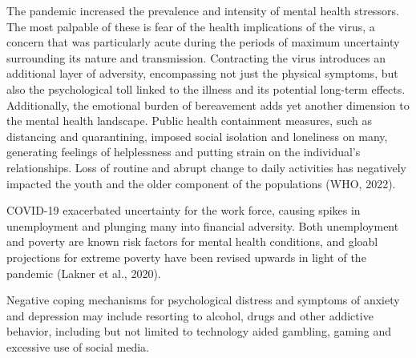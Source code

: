     The pandemic increased the prevalence and intensity of mental health stressors. The most palpable of these is fear of the health implications of the virus, a concern that was particularly acute during the periods of maximum uncertainty surrounding its nature and transmission. Contracting the virus introduces an additional layer of adversity, encompassing not just the physical symptoms, but also the psychological toll linked to the illness and its potential long-term effects. Additionally, the emotional burden of bereavement adds yet another dimension to the mental health landscape.
    Public health containment measures, such as distancing and quarantining, imposed social isolation and loneliness on many, generating feelings of helplessness and putting strain on the individual's relationships. Loss of routine and abrupt change to daily activities has negatively impacted the youth and the older component of the populations (WHO, 2022). 

    COVID-19 exacerbated uncertainty for the work force, causing spikes in unemployment and plunging many into financial adversity. Both unemployment and poverty are known risk factors for mental health conditions, and gloabl projections for extreme poverty have been revised upwards in light of the pandemic (Lakner et al., 2020). 

    Negative coping mechanisms for psychological distress and symptoms of anxiety and depression may include resorting to alcohol, drugs and other addictive behavior, including but not limited to technology aided gambling, gaming and excessive use of social media. 


